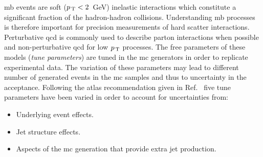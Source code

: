 \gls{mb} events are soft ($p_\mathrm{\, T} < 2$~GeV) inelastic interactions which constitute
a significant fraction of the hadron-hadron collisions. Understanding \gls{mb}
processes is therefore important for precision measurements of hard scatter
interactions. Perturbative \gls{qcd} is commonly used to describe parton
interactions when possible and non-perturbative \gls{qcd} for low $p_\mathrm{\, T}$
processes. The free parameters of these models (\emph{tune parameters}) are
tuned in the \gls{mc} generators in order to replicate experimental data. The
variation of these parameters may lead to different number of generated events
in the \gls{mc} samples and thus to uncertainty in the acceptance. Following the
\gls{atlas} recommendation given in Ref.~\cite{MCTuningRecommendations2015} five
tune parameters have been varied in order to account for uncertainties from:
\begin{itemize}
\item Underlying event effects.
\item Jet structure effects.
\item Aspects of the \gls{mc} generation that provide extra jet production.
\end{itemize}

